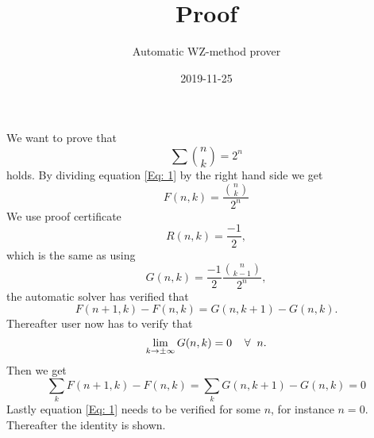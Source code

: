 \documentclass{article}
\title{Proof}
\author{Automatic WZ-method prover}
\date{2019-11-25}
\let\oldforall\forall
\renewcommand{\forall}{\hspace*{2mm}\oldforall\hspace*{1mm}}
\begin{document}
\maketitle
We want to prove that
\begin{equation}\label{Eq: 1}
\sum \binom{n}{k} = 2^n
\end{equation}
holds. By dividing equation \ref{Eq: 1} by the right hand side we get
\begin{equation}
F(n,k)=\frac{\binom{n}{k}}{2^{n}}
\end{equation}
We use proof certificate
\begin{equation}
R(n,k)=\frac{-1}{2},
\end{equation}
which is the same as using
\begin{equation}
G(n,k)=\frac{-1}{2}\frac{\binom{n}{k-1}}{2^{n}},
\end{equation}
the automatic solver has  verified that
\begin{equation}\label{Eq: WZ1}
F(n+1,k)-F(n,k)=G(n,k+1)-G(n,k).
\end{equation}
Thereafter user now has to verify that
\begin{equation}
\lim_{k\to\pm\infty}G(n,k)=0\forall n.
\end{equation}
Then we get
\begin{equation}
\sum_k F(n+1,k)-F(n,k)=\sum_k G(n,k+1)-G(n,k)=0\end{equation}Lastly equation \ref{Eq: 1} needs to be verified for some $n$, for instance $n=0$. Thereafter the identity is shown.
\end{document}
